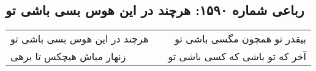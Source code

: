 \begin{center}
\section*{رباعی شماره ۱۵۹۰: هرچند در این هوس بسی باشی تو}
\label{sec:1590}
\begin{longtable}{l p{0.5cm} r}
هرچند در این هوس بسی باشی تو
&&
بیقدر تو همچون مگسی باشی تو
\\
زنهار مباش هیچکس تا برهی
&&
آخر که تو باشی که کسی باشی تو
\\
\end{longtable}
\end{center}
